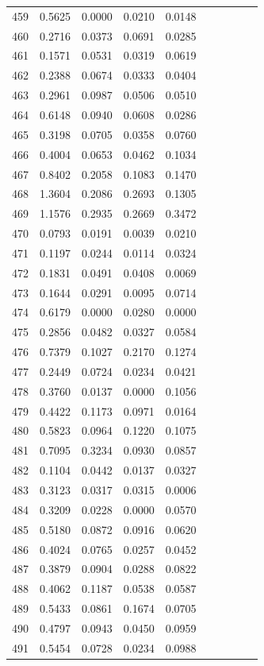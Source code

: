 \begin{table}
\begin{tabular}{cccccccccc}
459& 0.5625& 0.0000& 0.0210& 0.0148\\ 
460& 0.2716& 0.0373& 0.0691& 0.0285\\ 
461& 0.1571& 0.0531& 0.0319& 0.0619\\ 
462& 0.2388& 0.0674& 0.0333& 0.0404\\ 
463& 0.2961& 0.0987& 0.0506& 0.0510\\ 
464& 0.6148& 0.0940& 0.0608& 0.0286\\ 
465& 0.3198& 0.0705& 0.0358& 0.0760\\ 
466& 0.4004& 0.0653& 0.0462& 0.1034\\ 
467& 0.8402& 0.2058& 0.1083& 0.1470\\ 
468& 1.3604& 0.2086& 0.2693& 0.1305\\ 
469& 1.1576& 0.2935& 0.2669& 0.3472\\ 
470& 0.0793& 0.0191& 0.0039& 0.0210\\ 
471& 0.1197& 0.0244& 0.0114& 0.0324\\ 
472& 0.1831& 0.0491& 0.0408& 0.0069\\ 
473& 0.1644& 0.0291& 0.0095& 0.0714\\ 
474& 0.6179& 0.0000& 0.0280& 0.0000\\ 
475& 0.2856& 0.0482& 0.0327& 0.0584\\ 
476& 0.7379& 0.1027& 0.2170& 0.1274\\ 
477& 0.2449& 0.0724& 0.0234& 0.0421\\ 
478& 0.3760& 0.0137& 0.0000& 0.1056\\ 
479& 0.4422& 0.1173& 0.0971& 0.0164\\ 
480& 0.5823& 0.0964& 0.1220& 0.1075\\ 
481& 0.7095& 0.3234& 0.0930& 0.0857\\ 
482& 0.1104& 0.0442& 0.0137& 0.0327\\ 
483& 0.3123& 0.0317& 0.0315& 0.0006\\ 
484& 0.3209& 0.0228& 0.0000& 0.0570\\ 
485& 0.5180& 0.0872& 0.0916& 0.0620\\ 
486& 0.4024& 0.0765& 0.0257& 0.0452\\ 
487& 0.3879& 0.0904& 0.0288& 0.0822\\ 
488& 0.4062& 0.1187& 0.0538& 0.0587\\ 
489& 0.5433& 0.0861& 0.1674& 0.0705\\ 
490& 0.4797& 0.0943& 0.0450& 0.0959\\ 
491& 0.5454& 0.0728& 0.0234& 0.0988\\ 

\end{tabular}
\end{table}
